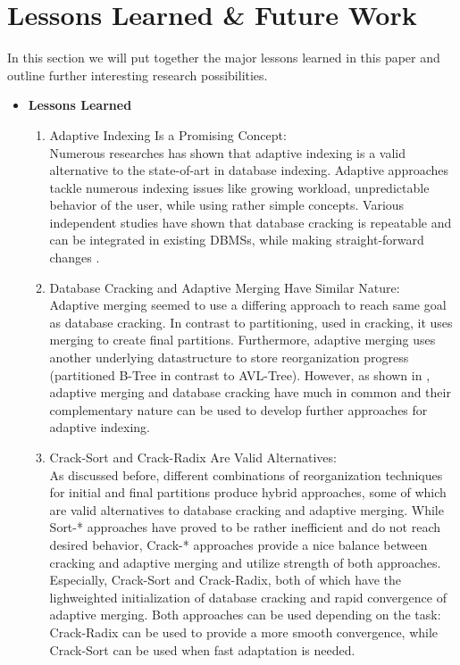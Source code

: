 \documentclass[10pt, conference, compsocconf]{IEEEtran}
\begin{document}
\section{Lessons Learned \& Future Work}
\label{sec:eval}
In this section we will put together the major lessons learned in this paper and outline further interesting research possibilities.
\begin{itemize}
\item{\textbf{Lessons Learned}}
\begin{enumerate}
\item{Adaptive Indexing Is a Promising Concept:}\\
Numerous researches has shown that adaptive indexing is a valid alternative to the state-of-art in database indexing. Adaptive approaches tackle numerous indexing issues like growing workload, unpredictable behavior of the user, while using rather simple concepts. Various independent studies have shown that database cracking is repeatable and can be integrated in existing DBMSs, while making straight-forward changes \cite{cracking}.\\
\item{Database Cracking and Adaptive Merging Have Similar Nature:}\\
Adaptive merging seemed to use a differing approach to reach same goal as database cracking. In contrast to partitioning, used in cracking, it uses merging to create final partitions. Furthermore, adaptive merging uses another underlying datastructure to store reorganization progress (partitioned B-Tree in contrast to AVL-Tree). However, as shown in \cite{hybrid}, adaptive merging and database cracking have much in common and their complementary nature can be used to develop further approaches for adaptive indexing.\\
\item{Crack-Sort and Crack-Radix Are Valid Alternatives:}\\
As discussed before, different combinations of reorganization techniques for initial and final partitions produce hybrid approaches, some of which are valid alternatives to database cracking and adaptive merging. While Sort-* approaches have proved to be rather inefficient and do not reach desired behavior, Crack-* approaches provide a nice balance between cracking and adaptive merging and utilize strength of both approaches. Especially, Crack-Sort and Crack-Radix, both of which have the lighweighted initialization of database cracking and rapid convergence of adaptive merging. Both approaches can be used depending on the task: Crack-Radix can be used to provide a more smooth convergence, while Crack-Sort can be used when fast adaptation is needed.\\

\end{enumerate}
\end{itemize}
\end{document}
